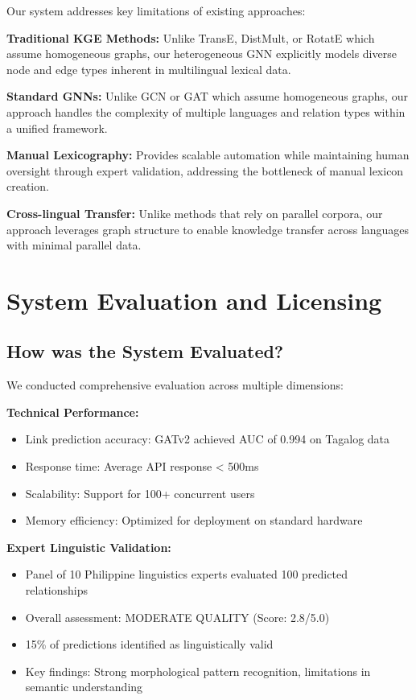 \documentclass[11pt]{article}
\begin{document}
Our system addresses key limitations of existing approaches:

\textbf{Traditional KGE Methods:} Unlike TransE, DistMult, or RotatE which assume homogeneous graphs, our heterogeneous GNN explicitly models diverse node and edge types inherent in multilingual lexical data.

\textbf{Standard GNNs:} Unlike GCN or GAT which assume homogeneous graphs, our approach handles the complexity of multiple languages and relation types within a unified framework.

\textbf{Manual Lexicography:} Provides scalable automation while maintaining human oversight through expert validation, addressing the bottleneck of manual lexicon creation.

\textbf{Cross-lingual Transfer:} Unlike methods that rely on parallel corpora, our approach leverages graph structure to enable knowledge transfer across languages with minimal parallel data.

\section{System Evaluation and Licensing}

\subsection{How was the System Evaluated?}

We conducted comprehensive evaluation across multiple dimensions:

\textbf{Technical Performance:}
\begin{itemize}
    \item Link prediction accuracy: GATv2 achieved AUC of 0.994 on Tagalog data
    \item Response time: Average API response < 500ms
    \item Scalability: Support for 100+ concurrent users
    \item Memory efficiency: Optimized for deployment on standard hardware
\end{itemize}

\textbf{Expert Linguistic Validation:}
\begin{itemize}
    \item Panel of 10 Philippine linguistics experts evaluated 100 predicted relationships
    \item Overall assessment: MODERATE QUALITY (Score: 2.8/5.0)
    \item 15\% of predictions identified as linguistically valid
    \item Key findings: Strong morphological pattern recognition, limitations in semantic understanding
\end{itemize}
\end{document}

